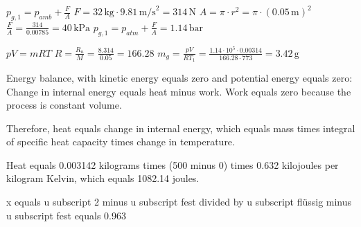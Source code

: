 \( p_{g,1} = p_{amb} + \frac{F}{A} \)  
\( F = 32 \, \text{kg} \cdot 9.81 \, \text{m/s}^2 = 314 \, \text{N} \)  
\( A = \pi \cdot r^2 = \pi \cdot (0.05 \, \text{m})^2 \)  
\( \frac{F}{A} = \frac{314}{0.00785} = 40 \, \text{kPa} \)  
\( p_{g,1} = p_{atm} + \frac{F}{A} = 1.14 \, \text{bar} \)  

\( pV = mRT \)  
\( R = \frac{R_u}{M} = \frac{8.314}{0.05} = 166.28 \)  
\( m_g = \frac{pV}{RT_1} = \frac{1.14 \cdot 10^5 \cdot 0.00314}{166.28 \cdot 773} = 3.42 \, \text{g} \)

Energy balance, with kinetic energy equals zero and potential energy equals zero:  
Change in internal energy equals heat minus work.  
Work equals zero because the process is constant volume.  

Therefore, heat equals change in internal energy, which equals mass times integral of specific heat capacity times change in temperature.  

Heat equals 0.003142 kilograms times (500 minus 0) times 0.632 kilojoules per kilogram Kelvin, which equals 1082.14 joules.

x equals u subscript 2 minus u subscript fest divided by u subscript flüssig minus u subscript fest equals 0.963